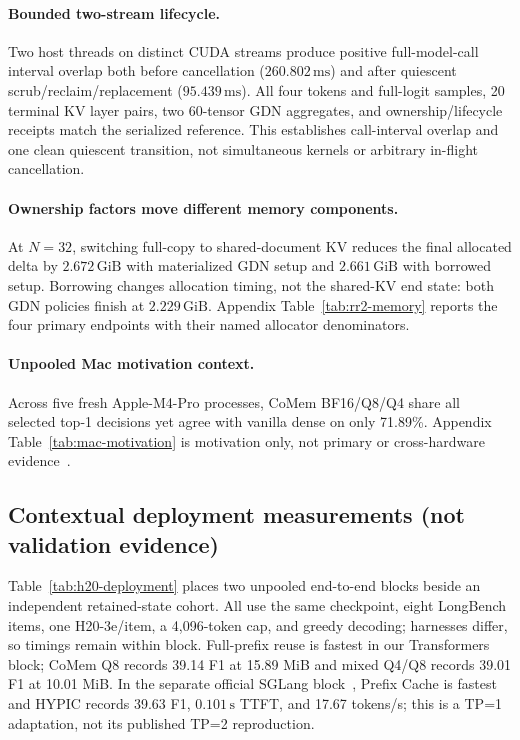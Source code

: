 \documentclass{article}
\newcommand{\gib}{\,\mathrm{GiB}}
\begin{document}
\paragraph{Bounded two-stream lifecycle.}
Two host threads on distinct CUDA streams produce positive full-model-call
interval overlap both before cancellation ($260.802\,\mathrm{ms}$) and after
quiescent scrub/reclaim/replacement ($95.439\,\mathrm{ms}$).  All four tokens
and full-logit samples, 20 terminal KV layer pairs, two 60-tensor GDN
aggregates, and ownership/lifecycle receipts match the serialized reference.
This establishes call-interval overlap and one clean quiescent transition, not
simultaneous kernels or arbitrary in-flight cancellation.

\paragraph{Ownership factors move different memory components.}

At $N=32$, switching full-copy to shared-document KV reduces the final allocated
delta by $2.672\gib$ with materialized GDN setup and $2.661\gib$ with borrowed
setup.  Borrowing changes allocation timing, not the shared-KV end state: both
GDN policies finish at $2.229\gib$.  Appendix Table~\ref{tab:rr2-memory} reports
the four primary endpoints with their named allocator denominators.

\paragraph{Unpooled Mac motivation context.}

Across five fresh Apple-M4-Pro processes, CoMem BF16/Q8/Q4 share all selected
top-1 decisions yet agree with vanilla dense on only 71.89\%.  Appendix
Table~\ref{tab:mac-motivation} is motivation only, not primary or cross-hardware
evidence~\citep{liu2026comem,liu2026understanding}.

\FloatBarrier
\subsection{Contextual deployment measurements (not validation evidence)}

Table~\ref{tab:h20-deployment} places two unpooled end-to-end blocks beside an
independent retained-state cohort.  All use the same checkpoint, eight
LongBench items, one H20-3e/item, a 4,096-token cap, and greedy decoding;
harnesses differ, so timings remain within block.  Full-prefix reuse is fastest
in our Transformers block; CoMem Q8 records 39.14 F1 at 15.89 MiB and mixed
Q4/Q8 records 39.01 F1 at 10.01 MiB.  In the separate official SGLang
block~\citep{liu2026hypic}, Prefix Cache is fastest and HYPIC records 39.63 F1,
$0.101\,\mathrm{s}$ TTFT, and 17.67 tokens/s; this is a TP=1 adaptation, not its
published TP=2 reproduction.
\end{document}
